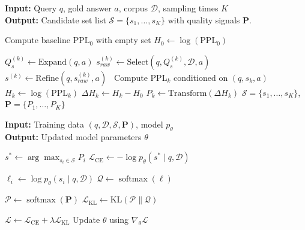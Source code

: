 \documentclass[11pt]{article}
\begin{document}
\begin{algorithm}[!h]
\caption{Training Data Construction}
\label{alg:data_construction}
\textbf{Input:} Query $q$, gold answer $a$, corpus $\mathcal{D}$, sampling times $K$ \\
\textbf{Output:} Candidate set list $\mathcal{S} = \{s_1,\dots,s_K\}$ with quality signals $\mathbf{P}$. 
\begin{algorithmic}[1]
    \State Compute baseline $\mathrm{PPL}_0$ with empty set
    \State $H_0 \gets \log(\mathrm{PPL}_0)$ 

        \State $Q_s^{(k)} \gets \text{Expand}(q,a)$ 
        \State $s_{raw}^{(k)} \gets \text{Select}(q, Q_s^{(k)},\mathcal{D}, a)$ 
        \State $s^{(k)} \gets \text{Refine}(q, s_{raw}^{(k)},a)$ \
        \State Compute $\mathrm{PPL}_k$ conditioned on $(q, s_k,a)$
        \State $H_k \gets \log(\mathrm{PPL}_k)$
        \State $\Delta H_k \gets H_k - H_0$ 
        \State $P_k \gets \text{Transform}(\Delta H_k)$ 
    \EndFor
    \State \Return $\mathcal{S}=\{s_1,\dots,s_K\}$, $\mathbf{P}=\{P_1,\dots,P_K\}$
\end{algorithmic}
\end{algorithm}


\begin{algorithm}[!h]
\caption{Set-List Wise Training}
\label{alg:training}
\textbf{Input:} Training data $(q, \mathcal{D}, \mathcal{S}, \mathbf{P})$, model $p_\theta$ \\
\textbf{Output:} Updated model parameters $\theta$
\begin{algorithmic}[1]

        \State $s^* \gets \arg\max_{s_i \in \mathcal{S}} P_i$ 
        \State $\mathcal{L}_{\mathrm{CE}} \gets -\log p_\theta(s^* \mid q, \mathcal{D})$ 

            \State $\ell_i \gets \log p_\theta(s_i \mid q, \mathcal{D})$
        \EndFor
        \State $\mathcal{Q} \gets \operatorname{softmax}(\boldsymbol{\ell})$ 

        \State $\mathcal{P} \gets \operatorname{softmax}(\mathbf{P})$ 
        \State $\mathcal{L}_{\mathrm{KL}} \gets \mathrm{KL}(\mathcal{P}\|\mathcal{Q})$ 


        \State $\mathcal{L} \gets \mathcal{L}_{\mathrm{CE}} + \lambda \mathcal{L}_{\mathrm{KL}}$ 
        \State Update $\theta$ using $\nabla_\theta \mathcal{L}$
    \EndFor
\end{algorithmic}
\end{algorithm}
\end{document}

